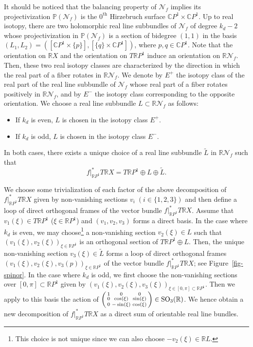 \documentclass[11pt]{amsart}
\numberwithin{equation}{section}
\theoremstyle{definition}
\theoremstyle{plain}
\theoremstyle{remark}
\newcommand{\R}{\mathbb{R}}
\newcommand{\C}{\mathbb{C}}
\DeclareMathOperator{\SO}{SO}
\newcommand{\supth}[1]{\ensuremath{#1^{\mathrm{th}}}}
\begin{document}
 It should be noticed that the balancing property  of $\mathcal{N}_f$ implies its projectivization  $\mathbb{P}(\mathcal{N}_f)$ is the $\supth{0}$ Hirzebruch surface $\C P^1 \times \C P^1$.  Up to real isotopy, there are two holomorphic real line subbundles of $ \mathcal{N}_f$ of degree $k_d-2$ whose projectivization in $ \mathbb{P}(\mathcal{N}_f)$ is a section of bidegree $(1,1)$ in the basis $(L_1,L_2)=([\C P^1\times\{p\}],[\{q\}\times \C P^1])$, where $p,q\in \C P^1$. Note that the orientation on $\R X$ and the orientation on $T \R P^1$ induce an orientation on  $\R \mathcal{N}_f$. Then, these two real isotopy classes are characterized by the direction in which the real part of a fiber rotates in $\R \mathcal{N}_f$. We denote by $E^+$ the isotopy class of the real part of the real line subbundle of  $\mathcal{N}_f$ whose real part of a fiber rotates positively  in $\R \mathcal{N}_f$, and by $E^-$ the isotopy class corresponding to the opposite orientation. We choose a real line subbundle  $L\subset \R \mathcal{N}_f$ as follows:  
\begin{itemize}
    \item If $k_d$ is even, $L$ is chosen in the isotopy class $E^+$. 
    \item If {$k_d$ is odd},  $L$ is chosen in the isotopy class $E^-$. 
\end{itemize}


In both cases, there exists a unique choice of a real line subbundle $\tilde{L}$ in $\R \mathcal{N}_f$ such that $$f|_{\R P^1}^*T \R X=T \R P^1 \oplus L \oplus \tilde{L}.$$
 


We choose some trivialization of each factor of the above decomposition of $f|_{\R P^1}^*T \R X$ given by non-vanishing sections $v_i\;(i \in \{1,2,3\})$ and then define a  loop of direct orthogonal frames of the vector bundle $ f|_{\R P^1}^*T \R X$. Assume that  $v_1(\xi)\in T\R P^1$ ($\xi\in \R P^1$)  and $(v_1,v_2,v_3)$ forms a direct basis. In the case where $k_d$ is even, we may choose\footnote{ This choice is not unique since we can also choose $-v_2(\xi)\in \R L$.} 
a non-vanishing section $v_2(\xi)\in L$ such that $(v_1(\xi),v_2(\xi))_{\xi\in \R P^1}$  is an orthogonal section of $T \R P^1 \oplus L$. Then, the unique non-vanishing section $v_3(\xi)\in \tilde{L}$ forms a loop of direct orthogonal frames $(v_1(\xi),v_2(\xi),v_3(p))_{\xi\in \R P^1}$ of the vector bundle $ f|_{\R P^1}^*T \R X$; see Figure~\ref{fig-spinor}. In the case where $k_d$ is odd, we first choose the non-vanishing sections over $[0,\pi]\subset \R P^1$ given by  $(v_1(\xi),v_2(\xi),v_3(\xi))_{\xi\in [0,\pi]\subset \R P^1}$. Then we apply to this basis the action of $\begin{psmallmatrix} 1& 0&0\\ 0&\cos(\xi) & \sin(\xi) \\ 0 & -\sin(\xi) & \cos(\xi) \end{psmallmatrix} \in \SO_3(\R)$.
We hence obtain
a new decomposition of $f|_{\R P^1}^*T \R X$ as a direct sum of orientable real line bundles.
\end{document}

